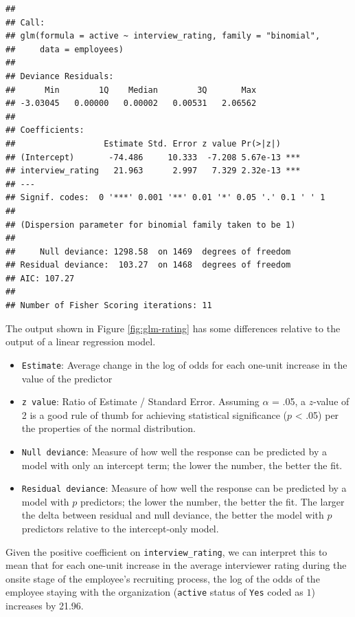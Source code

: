 \documentclass[
]{book}
\providecommand{\tightlist}{%
  \setlength{\itemsep}{0pt}\setlength{\parskip}{0pt}}
\begin{document}
\begin{verbatim}
## 
## Call:
## glm(formula = active ~ interview_rating, family = "binomial", 
##     data = employees)
## 
## Deviance Residuals: 
##      Min        1Q    Median        3Q       Max  
## -3.03045   0.00000   0.00002   0.00531   2.06562  
## 
## Coefficients:
##                  Estimate Std. Error z value Pr(>|z|)    
## (Intercept)       -74.486     10.333  -7.208 5.67e-13 ***
## interview_rating   21.963      2.997   7.329 2.32e-13 ***
## ---
## Signif. codes:  0 '***' 0.001 '**' 0.01 '*' 0.05 '.' 0.1 ' ' 1
## 
## (Dispersion parameter for binomial family taken to be 1)
## 
##     Null deviance: 1298.58  on 1469  degrees of freedom
## Residual deviance:  103.27  on 1468  degrees of freedom
## AIC: 107.27
## 
## Number of Fisher Scoring iterations: 11
\end{verbatim}

The output shown in Figure \ref{fig:glm-rating} has some differences relative to the output of a linear regression model.

\begin{itemize}
\tightlist
\item
  \texttt{Estimate}: Average change in the log of odds for each one-unit increase in the value of the predictor
\item
  \texttt{z\ value}: Ratio of Estimate / Standard Error. Assuming \(\alpha\) = .05, a \(z\)-value of 2 is a good rule of thumb for achieving statistical significance (\(p\) \textless{} .05) per the properties of the normal distribution.
\item
  \texttt{Null\ deviance}: Measure of how well the response can be predicted by a model with only an intercept term; the lower the number, the better the fit.
\item
  \texttt{Residual\ deviance}: Measure of how well the response can be predicted by a model with \(p\) predictors; the lower the number, the better the fit. The larger the delta between residual and null deviance, the better the model with \(p\) predictors relative to the intercept-only model.
\end{itemize}

Given the positive coefficient on \texttt{interview\_rating}, we can interpret this to mean that for each one-unit increase in the average interviewer rating during the onsite stage of the employee's recruiting process, the log of the odds of the employee staying with the organization (\texttt{active} status of \texttt{Yes} coded as \(1\)) increases by 21.96.
\end{document}
